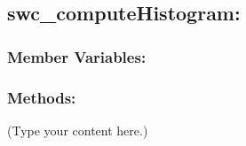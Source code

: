 \documentclass{article}
\begin{document}
\subsection{swc\_computeHistogram:}


\subsubsection{Member Variables:}
\subsubsection{Methods:}


(Type your content here.)
\end{document}
